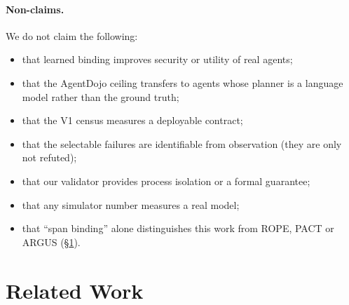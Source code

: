 \documentclass{article}
\begin{document}
\paragraph{Non-claims.}
We do not claim the following:
\begin{itemize}
\item that learned binding improves security or utility of real agents;
\item that the AgentDojo ceiling transfers to agents whose planner is a
language model rather than the ground truth;
\item that the V1 census measures a deployable contract;
\item that the selectable failures are identifiable from observation (they
are only not refuted);
\item that our validator provides process isolation or a formal guarantee;
\item that any simulator number measures a real model;
\item that ``span binding'' alone distinguishes this work from ROPE, PACT or
ARGUS (\S\ref{sec:related}).
\end{itemize}

\section{Related Work}
\label{sec:related}
\end{document}
